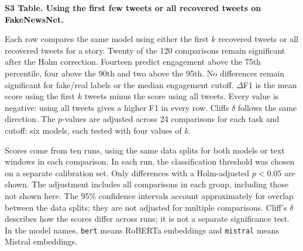 \documentclass[10pt,letterpaper]{article}
\begin{document}
{\large\bfseries S3 Table. Using the first few tweets or all recovered tweets on FakeNewsNet.}\par\medskip
Each row compares the same model using either the first $k$ recovered tweets or all recovered tweets for a story. Twenty of the 120 comparisons remain significant after the Holm correction. Fourteen predict engagement above the 75th percentile, four above the 90th and two above the 95th. No differences remain significant for fake/real labels or the median engagement cutoff. $\Delta$F1 is the mean score using the first $k$ tweets minus the score using all tweets. Every value is negative: using all tweets gives a higher F1 in every row. Cliff\textquotesingle s $\delta$ follows the same direction. The $p$-values are adjusted across 24 comparisons for each task and cutoff: six models, each tested with four values of $k$.\par\smallskip
Scores come from ten runs, using the same data splits for both models or text windows in each comparison. In each run, the classification threshold was chosen on a separate calibration set. Only differences with a Holm-adjusted $p<0.05$ are shown. The adjustment includes all comparisons in each group, including those not shown here. The 95\% confidence intervals account approximately for overlap between the data splits; they are not adjusted for multiple comparisons. Cliff's $\delta$ describes how the scores differ across runs; it is not a separate significance test. In the model names, \texttt{bert} means RoBERTa embeddings and \texttt{mistral} means Mistral embeddings.\par\medskip
\small
\end{document}
